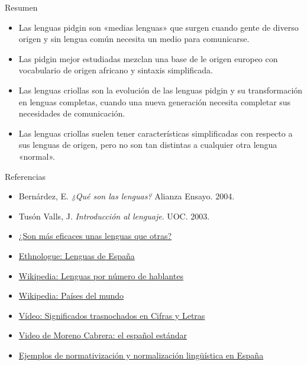\documentclass[handout]{beamer}
\begin{document}
\begin{frame}{Resumen}
\begin{itemize}
	\item Las lenguas pidgin son «medias lenguas» que surgen cuando gente de diverso origen y sin lengua común necesita un medio para comunicarse.
	\item Las pidgin mejor estudiadas mezclan una base de le origen europeo con vocabulario de origen africano y sintaxis simplificada.
	\item Las lenguas criollas son la evolución de las lenguas pidgin y su transformación en lenguas completas, cuando una nueva generación necesita completar sus necesidades de comunicación.
	\item Las lenguas criollas suelen tener características simplificadas con respecto a sus lenguas de origen, pero no son tan distintas a cualquier otra lengua «normal».
\end{itemize}
\end{frame}



\begin{frame}{Referencias}

\begin{itemize}
   \item Bernárdez, E. \textit{¿Qué son las lenguas?} Alianza Ensayo. 2004.
   \item Tusón Valls, J. \textit{Introducción al lenguaje}. UOC. 2003.
   \item \href{http://medina-psicologia.ugr.es/cienciacognitiva/?p=329}{¿Son más eficaces unas lenguas que otras?}
   \item \href{http://www.ethnologue.com/show_country.asp?name=ES}{Ethnologue: Lenguas de España}
   \item \href{http://es.wikipedia.org/wiki/Anexo:Lenguas_por_n\%C3\%BAmero_de_hablantes}{Wikipedia: Lenguas por número de hablantes}
   \item \href{http://es.wikipedia.org/wiki/Anexo:Pa\%C3\%ADses_del_mundo}{Wikipedia: Países del mundo}
   \item \href{http://www.youtube.com/watch?v=c9_9K-9wI9U}{Vídeo: Significados trasnochados en Cifras y Letras}
   \item \href{http://www.youtube.com/watch?v=sBiM3ELPjXs}{Video de Moreno Cabrera: el español estándar}
   \item \href{http://www.jarique.com/lengua_normativizacion1.htm}{Ejemplos de normativización y normalización lingüística en España}
\end{itemize}

\end{frame}
\end{document}
